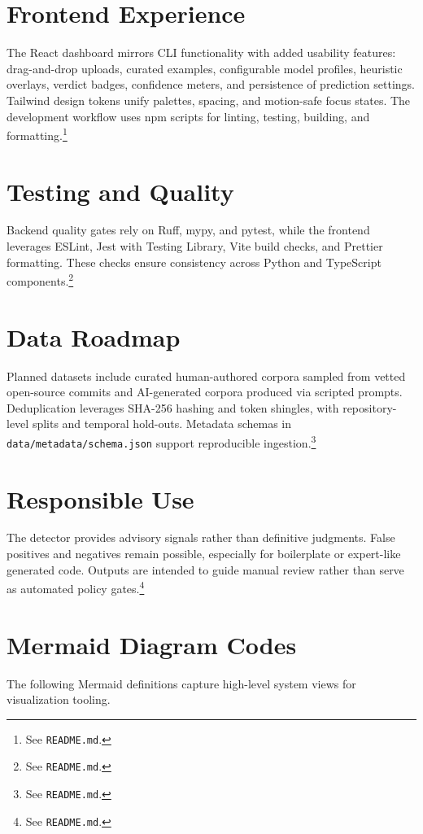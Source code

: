 \documentclass[11pt]{article}
\begin{document}
\section{Frontend Experience}
\label{sec:frontend}
The React dashboard mirrors CLI functionality with added usability features: drag-and-drop uploads, curated examples, configurable model profiles, heuristic overlays, verdict badges, confidence meters, and persistence of prediction settings. Tailwind design tokens unify palettes, spacing, and motion-safe focus states. The development workflow uses npm scripts for linting, testing, building, and formatting.\footnote{See \texttt{README.md}.}

\section{Testing and Quality}
\label{sec:quality}
Backend quality gates rely on Ruff, mypy, and pytest, while the frontend leverages ESLint, Jest with Testing Library, Vite build checks, and Prettier formatting. These checks ensure consistency across Python and TypeScript components.\footnote{See \texttt{README.md}.}

\section{Data Roadmap}
\label{sec:data}
Planned datasets include curated human-authored corpora sampled from vetted open-source commits and AI-generated corpora produced via scripted prompts. Deduplication leverages SHA-256 hashing and token shingles, with repository-level splits and temporal hold-outs. Metadata schemas in \texttt{data/metadata/schema.json} support reproducible ingestion.\footnote{See \texttt{README.md}.}

\section{Responsible Use}
\label{sec:responsible}
The detector provides advisory signals rather than definitive judgments. False positives and negatives remain possible, especially for boilerplate or expert-like generated code. Outputs are intended to guide manual review rather than serve as automated policy gates.\footnote{See \texttt{README.md}.}

\section{Mermaid Diagram Codes}
\label{sec:mermaid}
The following Mermaid definitions capture high-level system views for visualization tooling.
\end{document}
